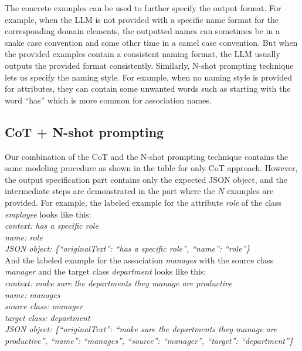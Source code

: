 The concrete examples can be used to further specify the output format. For example, when the LLM is not provided with a specific name format for the corresponding domain elements, the outputted names can sometimes be in a snake case convention and some other time in a camel case convention. But when the provided examples contain a consistent naming format, the LLM usually outputs the provided format consistently. Similarly, N-shot prompting technique lets us specify the naming style. For example, when no naming style is provided for attributes, they can contain some unwanted words such as starting with the word ``has'' which is more common for association names.


\subsection{CoT + N-shot prompting}

Our combination of the CoT and the N-shot prompting technique contains the same modeling procedure as shown in the table for only CoT approach. However, the output specification part contains only the expected JSON object, and the intermediate steps are demonstrated in the part where the $N$ examples are provided. For example, the labeled example for the attribute \textit{role} of the class \textit{employee} looks like this: \\

\noindent{}\textit{context: has a specific role} \\
\textit{name: role} \\
\textit{JSON object: \{``originalText'': ``has a specific role'', ``name'': ``role''\}} \\

\noindent{}And the labeled example for the association \textit{manages} with the source class \textit{manager} and the target class \textit{department} looks like this: \\

\noindent{}\textit{context: make sure the departments they manage are productive} \\
\textit{name: manages} \\
\textit{source class: manager} \\
\textit{target class: department} \\
\textit{JSON object: \{``originalText'': ``make sure the departments they manage are productive'', ``name'': ``manages'', ``source'': ``manager'', ``target'': ``department''\}}


